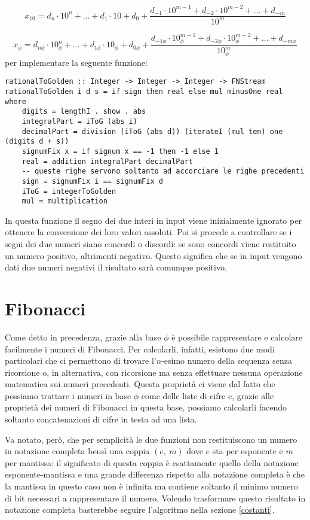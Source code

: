 \documentclass[Lau,oneside]{sapthesis}
\begin{document}
$$x_{10} = d_n \cdot 10^n + \ldots + d_1 \cdot 10 + d_0 + \frac{d_{-1} \cdot 10^{m-1} + d_{-2} \cdot 10^{m-2} + \ldots + d_{-m}}{10^m}$$

$$x_\phi = d_{n\phi} \cdot 10_\phi^n + \ldots + d_{1\phi} \cdot 10_\phi + d_{0\phi} + \frac{d_{-1\phi} \cdot 10_\phi^{m-1} + d_{-2\phi} \cdot 10_\phi^{m-2} + \ldots + d_{-m\phi}}{10_\phi^m}$$
per implementare la seguente funzione:
\begin{verbatim}
rationalToGolden :: Integer -> Integer -> Integer -> FNStream
rationalToGolden i d s = if sign then real else mul minusOne real where
    digits = lengthI . show . abs
    integralPart = iToG (abs i)
    decimalPart = division (iToG (abs d)) (iterateI (mul ten) one (digits d + s))
    signumFix x = if signum x == -1 then -1 else 1
    real = addition integralPart decimalPart
    -- queste righe servono soltanto ad accorciare le righe precedenti
    sign = signumFix i == signumFix d
    iToG = integerToGolden
    mul = multiplication
\end{verbatim}
In questa funzione il segno dei due interi in input viene inizialmente ignorato per ottenere la conversione dei loro valori assoluti. Poi si procede a controllare se i segni dei due numeri siano concordi o discordi: se sono concordi viene restituito un numero positivo, altrimenti negativo. Questo significa che se in input vengono dati due numeri negativi il risultato sarà comunque positivo.


\section{Fibonacci}
Come detto in precedenza, grazie alla base $\phi$ è possibile rappresentare e calcolare facilmente i numeri di Fibonacci. Per calcolarli, infatti, esistono due modi particolari che ci permettono di trovare l'$n$-esimo numero della sequenza senza ricorsione o, in alternativa, con ricorsione ma senza effettuare nessuna operazione matematica sui numeri precedenti. Questa proprietà ci viene dal fatto che possiamo trattare i numeri in base $\phi$ come delle liste di cifre e, grazie alle proprietà dei numeri di Fibonacci in questa base, possiamo calcolarli facendo soltanto concatenazioni di cifre in testa ad una lista.

Va notato, però, che per semplicità le due funzioni non restituiscono un numero in notazione completa bensì una coppia $(e, \ m)$ dove $e$ sta per esponente e $m$ per mantissa: il significato di questa coppia è esattamente quello della notazione esponente-mantissa e una grande differenza rispetto alla notazione completa è che la mantissa in questo caso non è infinita ma contiene soltanto il minimo numero di bit necessari a rappresentare il numero. Volendo trasformare questo risultato in notazione completa basterebbe seguire l'algoritmo nella sezione \ref{costanti}.
\end{document}

